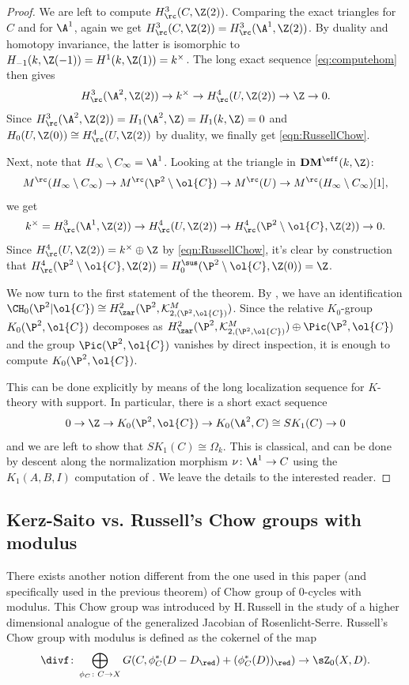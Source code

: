 \begin{proof}
We are left to compute $H_{\rc}^{3}(C, \Z(2))$. Comparing the exact triangles for $C$ and for $\A^1$, again we get $H_{\rc}^{3}(C, \Z(2)) = H_{\rc}^{3}(\A^1, \Z(2))$. By duality and homotopy invariance, the latter is isomorphic to $H_{-1}(k, \Z(-1)) = H^1(k, \Z(1)) = k^\times$. The long exact sequence \eqref{eq:computehom} then gives
\[ H_{\rc}^{3}(\A^2, \Z(2)) \to k^\times \to H_{\rc}^4(U, \Z(2)) \to \Z \to 0.\]
Since $H_{\rc}^{3}(\A^2, \Z(2)) = H_1(\A^2, \Z) = H_1(k, \Z) = 0$ and
$H_0(U, \Z(0)) \cong H_{\rc}^4(U, \Z(2))$ by duality, we finally get \eqref{eqn:RussellChow}.

Next, note that $H_\infty\setminus C_\infty = \A^1$. Looking at the triangle in
${\mathbf{DM}}^{\eff}(k, \Z)$:
\[ M^\rc(H_\infty\setminus C_\infty) \to M^\rc(\P^2\setminus \ol{C}) \to M^\rc(U) \to M^\rc(H_\infty\setminus C_\infty)[1],\]
we get
\[k^\times = H_{\rc}^{3}(\A^1, \Z(2)) \to H_{\rc}^4(U, \Z(2)) \to H_{\rc}^4(\P^2\setminus \ol{C}, \Z(2)) \to 0.\]
Since $H_{\rc}^4(U, \Z(2)) = k^\times\oplus \Z$ by \eqref{eqn:RussellChow}, it's clear by construction that $H_{\rc}^4(\P^2\setminus \ol{C}, \Z(2)) = H_0^{\sus}(\P^2 \setminus \ol{C}, \Z(0))=\Z$.

We now turn to the first statement of the theorem. By \cite[Th.\,1.1]{BKS},
we have an identification $\CH_0(\P^2|\ol{C}) \cong
H^2_{\zar}(\P^2, \mathcal{K}^M_{2, (\P^2, \ol{C})})$.
Since the relative $K_0$-group $K_0(\P^2, \ol{C})$ decomposes as
$H^2_{\zar}(\P^2, \mathcal{K}^M_{2, (\P^2, \ol{C})}) \oplus \Pic(\P^2, \ol{C})$ and the
group $\Pic(\P^2, \ol{C})$ vanishes by direct inspection, it is enough to compute
$K_0(\P^2, \ol{C})$.

This can be done explicitly by means of the long localization sequence for $K$-theory
with support. In particular, there is a short exact sequence
\[0\to \Z \to K_0(\P^2, \ol{C}) \to K_0(\A^2, C) \cong SK_1(C)\to 0\]
and we are left to show that $SK_1(C) \cong \Omega_{k}$. This is classical, and
can be done by descent along the normalization morphism $\nu\colon \A^1\to C$ using
the $K_1(A,B,I)$ computation of \cite{GW}. We leave the details to the interested
reader.
\end{proof}

\subsection{Kerz-Saito vs. Russell's Chow groups with modulus}
\label{sec:Russell}
There exists another notion different from the one used in this paper (and specifically used in the previous theorem) of Chow group of $0$-cycles with
modulus. This Chow group was introduced by H.\,Russell \cite{RussellANT} in the study of a higher dimensional analogue of the generalized Jacobian of Rosenlicht-Serre. Russell's Chow group with modulus is defined as the cokernel of the map
\[\divf\colon \bigoplus_{\phi_C\colon C\to X}G(C, \phi_C^*(D-D_{\red}) + (\phi_C^*(D))_{\red})\to \sZ_0(X,D).\]

